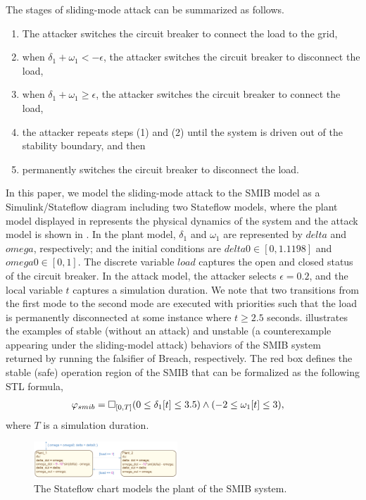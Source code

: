 The stages of sliding-mode attack can be summarized as follows.
\begin{enumerate}
	\item The attacker switches the circuit breaker to connect the load to the grid,
	\item when $\delta_1 + \omega_1 < -\epsilon$, the attacker switches the circuit breaker to disconnect the load, 
  \item when $\delta_1 + \omega_1 \geq \epsilon$, the attacker switches the circuit breaker to connect the load,
  \item the attacker repeats steps (1) and (2) until the system is driven out of the stability boundary, and then
  \item permanently switches the circuit breaker to disconnect the load.
\end{enumerate}
%
In this paper, we model the sliding-mode attack to the SMIB model as a Simulink/Stateflow diagram including two Stateflow models, where the plant model displayed in  represents the physical dynamics of the system and the attack model is shown in . 
%
In the plant model, $\delta_1$ and $\omega_1$ are represented by $delta$ and $omega$, respectively; and the initial conditions are $delta0 \in [0, 1.1198]$ and $omega0 \in [0, 1]$. The discrete variable $load$ captures the open and closed status of the circuit breaker.
%
In the attack model, the attacker selects $\epsilon = 0.2$, and the local variable $t$ captures a simulation duration. We note that two transitions from the first mode to the second mode are executed with priorities such that the load is permanently disconnected at some instance where $t \geq 2.5$ seconds. 
%
%
 illustrates the examples of stable (\ie without an attack) and unstable (\ie a counterexample appearing under the sliding-model attack) behaviors of the SMIB system returned by running the falsifier of Breach, respectively. The red box defines the stable (safe) operation region of the SMIB that can be formalized as the following STL formula, 
%
\begin{align} 
\vspace{-1em}
	\varphi_{smib} & = \Box_{[0, T]} (0 \leq \delta_1[t] \leq 3.5) \wedge (-2 \leq \omega_1[t] \leq 3),\formlabel{smib_stl}
\end{align} 
where $T$ is a simulation duration.   
%
\begin{figure}[t!]%
	\centering%
    \includegraphics[width=0.48\textwidth]{image/smib_plant_model}%
	\caption{The Stateflow chart models the plant of the SMIB system.}%
\end{figure}%

